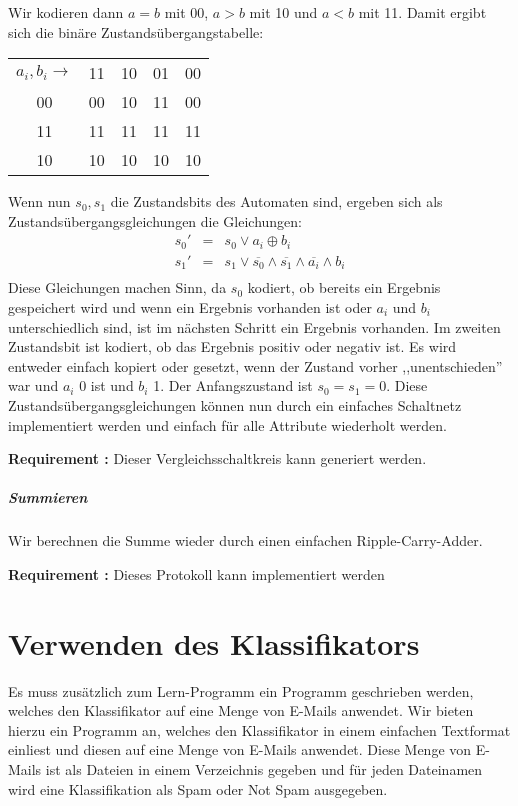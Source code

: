 \documentclass{article}
\newcounter{requirementscount}{}
\newcommand{\requirement}[1] {
        \addtocounter{requirementscount}{1}
        {\bf Requirement \therequirementscount:} #1\\
    }
\begin{document}
Wir kodieren dann \(a = b\) mit 00, \(a > b\) mit 10 und
\(a < b\) mit 11. Damit ergibt sich die bin\"are Zustands\"ubergangstabelle:\\
\begin{center}
\begin{tabular}{c|c c c c}
\(a_i, b_i \rightarrow\) & 11 & 10 & 01 & 00 \\
00 & 00 & 10 & 11 & 00 \\
11 & 11 & 11 & 11 & 11 \\
10 & 10 & 10 & 10 & 10 \\
\end{tabular}
\end{center}
Wenn nun \(s_0, s_1\) die Zustandsbits des Automaten sind, ergeben sich
als Zustands\"ubergangsgleichungen die Gleichungen:
\begin{align}
s_0' &=& s_0 \vee a_i \oplus b_i\\
s_1' &=& s_1 \vee \overline{s_0} \wedge \overline{s_1} \wedge \overline{a_i} \wedge b_i\\
\end{align}
Diese Gleichungen machen Sinn, da \(s_0\) kodiert, ob bereits
ein Ergebnis gespeichert wird und wenn ein Ergebnis vorhanden
ist oder \(a_i\) und \(b_i\) unterschiedlich sind, ist im n\"achsten
Schritt ein Ergebnis vorhanden. Im zweiten Zustandsbit ist kodiert,
ob das Ergebnis positiv oder negativ ist. Es wird entweder einfach
kopiert oder gesetzt, wenn der Zustand vorher ,,unentschieden'' war
und \(a_i\) 0 ist und \(b_i\) 1. Der Anfangszustand ist \(s_0 = s_1 = 0\).
Diese Zustands\"ubergangsgleichungen k\"onnen nun durch ein
einfaches Schaltnetz implementiert werden und einfach f\"ur alle
Attribute wiederholt werden.\\
\requirement{Dieser Vergleichsschaltkreis kann generiert werden.}

\subparagraph{Summieren}
Wir berechnen die Summe wieder durch einen einfachen Ripple-Carry-Adder.\\

\requirement{Dieses Protokoll kann implementiert werden}

\pagebreak  %
\section{Verwenden des Klassifikators}
Es muss zus\"atzlich zum Lern-Programm ein Programm geschrieben
werden, welches den Klassifikator auf eine Menge von E-Mails anwendet.
Wir bieten hierzu ein Programm an, welches den Klassifikator in einem
einfachen Textformat einliest und diesen auf eine Menge von E-Mails
anwendet. Diese Menge von E-Mails ist als Dateien in einem Verzeichnis
gegeben und f\"ur jeden Dateinamen wird eine Klassifikation als Spam
oder Not Spam ausgegeben.
\end{document}
